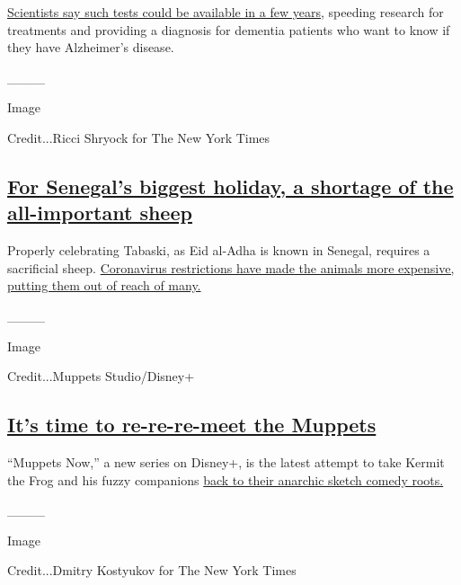 \href{https://www.nytimes3xbfgragh.onion/2020/07/28/health/alzheimers-blood-test.html}{Scientists
say such tests could be available in a few years,} speeding research for
treatments and providing a diagnosis for dementia patients who want to
know if they have Alzheimer's disease.

\_\_\_\_

Image

Credit...Ricci Shryock for The New York Times

\hypertarget{for-senegals-biggest-holiday-a-shortage-of-the-all-important-sheep}{%
\subsection{\texorpdfstring{\href{https://www.nytimes3xbfgragh.onion/2020/07/29/world/africa/senegal-tabaski-sheep-eid-adha.html}{For
Senegal's biggest holiday, a shortage of the all-important
sheep}}{For Senegal's biggest holiday, a shortage of the all-important sheep}}\label{for-senegals-biggest-holiday-a-shortage-of-the-all-important-sheep}}

Properly celebrating Tabaski, as Eid al-Adha is known in Senegal,
requires a sacrificial sheep.
\href{https://www.nytimes3xbfgragh.onion/2020/07/29/world/africa/senegal-tabaski-sheep-eid-adha.html}{Coronavirus
restrictions have made the animals more expensive, putting them out of
reach of many.}

\_\_\_\_

Image

Credit...Muppets Studio/Disney+

\hypertarget{its-time-to-re-re-re-meet-the-muppets}{%
\subsection{\texorpdfstring{\href{https://www.nytimes3xbfgragh.onion/2020/07/23/arts/television/muppets-now-disney.html}{It's
time to re-re-re-meet the
Muppets}}{It's time to re-re-re-meet the Muppets}}\label{its-time-to-re-re-re-meet-the-muppets}}

``Muppets Now,'' a new series on Disney+, is the latest attempt to take
Kermit the Frog and his fuzzy companions
\href{https://www.nytimes3xbfgragh.onion/2020/07/23/arts/television/muppets-now-disney.html}{back
to their anarchic sketch comedy roots.}

\_\_\_\_

Image

Credit...Dmitry Kostyukov for The New York Times

